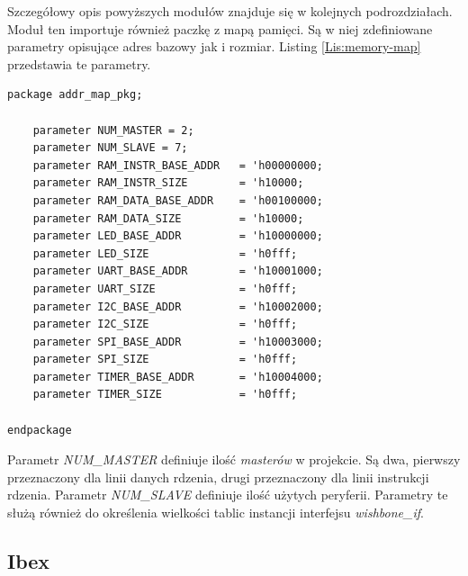 \documentclass[11pt,a4paper]{article}
\begin{document}
Szczegółowy opis powyższych modułów znajduje się w kolejnych podrozdziałach. 
Moduł ten importuje również paczkę z mapą pamięci. Są w niej zdefiniowane parametry opisujące adres bazowy jak i rozmiar. Listing \ref{Lis:memory-map} przedstawia te parametry.

\begin{minipage}{\textwidth}
\begin{scriptsize}
\begin{lstlisting}[label=Lis:memory-map,caption=Mapa pamięci]
package addr_map_pkg;

	parameter NUM_MASTER = 2;
	parameter NUM_SLAVE = 7;
	parameter RAM_INSTR_BASE_ADDR   = 'h00000000;
	parameter RAM_INSTR_SIZE        = 'h10000;
	parameter RAM_DATA_BASE_ADDR    = 'h00100000;
	parameter RAM_DATA_SIZE         = 'h10000;
	parameter LED_BASE_ADDR         = 'h10000000;
	parameter LED_SIZE              = 'h0fff;
	parameter UART_BASE_ADDR        = 'h10001000;
	parameter UART_SIZE             = 'h0fff;
	parameter I2C_BASE_ADDR         = 'h10002000;
	parameter I2C_SIZE              = 'h0fff;
	parameter SPI_BASE_ADDR         = 'h10003000;
	parameter SPI_SIZE              = 'h0fff;
	parameter TIMER_BASE_ADDR       = 'h10004000;
	parameter TIMER_SIZE            = 'h0fff;

endpackage
\end{lstlisting}
\end{scriptsize}
\end{minipage}
Parametr \textit{NUM\_MASTER} definiuje ilość \textit{masterów} w projekcie. Są dwa, pierwszy przeznaczony dla linii danych rdzenia, drugi przeznaczony dla linii instrukcji rdzenia. Parametr \textit{NUM\_SLAVE} definiuje ilość użytych peryferii. Parametry te służą również do określenia wielkości tablic instancji interfejsu \textit{wishbone\_if}.
	\subsection{Ibex}
\end{document}
